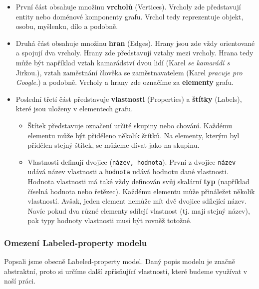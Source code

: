 \begin{itemize}
\item První část obsahuje množinu \textbf{vrcholů} (Vertices).
Vrcholy zde představují entity nebo doménové komponenty grafu.
Vrchol tedy reprezentuje objekt, osobu, myšlenku, dílo a podobně.

\item Druhá část obsahuje množinu \textbf{hran} (Edges).
Hrany jsou zde vždy orientované a spojují dva vrcholy.
Hrany zde představují vztahy mezi vrcholy.
Hrana tedy může být například vztah kamarádství dvou lidí (Karel \textit{se kamarádí s} Jirkou.), vztah zaměstnání člověka se zaměstnavatelem (Karel \textit{pracuje pro Google.}) a podobně.
Vrcholy a hrany zde označíme za \textbf{elementy} grafu.
\item Poslední třetí část představuje \textbf{vlastnosti} (Properties) a \textbf{štítky} (Labels), které jsou uloženy v elementech grafu.

\begin{itemize}
\item
Štítek představuje označení určité skupiny nebo chování.
Každému elementu může být přiděleno několik štítků.
Na elementy, kterým byl přidělen stejný štítek, se můžeme dívat jako na skupinu.

\item
Vlastnosti definují dvojice (\texttt{název, hodnota}).
První z dvojice \texttt{název} udává název vlastnosti a \texttt{hodnota} udává hodnotu dané vlastnosti.
Hodnota vlastnosti má také vždy definován svůj skalární \textbf{typ} (například číselná hodnota nebo řetězec).
Každému elementu může přináležet několik vlastností.
Avšak, jeden element nemůže mít dvě dvojice sdílející název.
Navíc pokud dva různé elementy sdílejí vlastnost (tj. mají stejný název), pak typy hodnoty vlastnosti musí být rovněž totožné.
\end{itemize}
\end{itemize}

\subsubsection{Omezení Labeled-property modelu}
Popsali jsme obecně Labeled-property model.
Daný popis modelu je značně abstraktní, proto si určíme další zpřísňující vlastnosti, které budeme využívat v naší práci.

